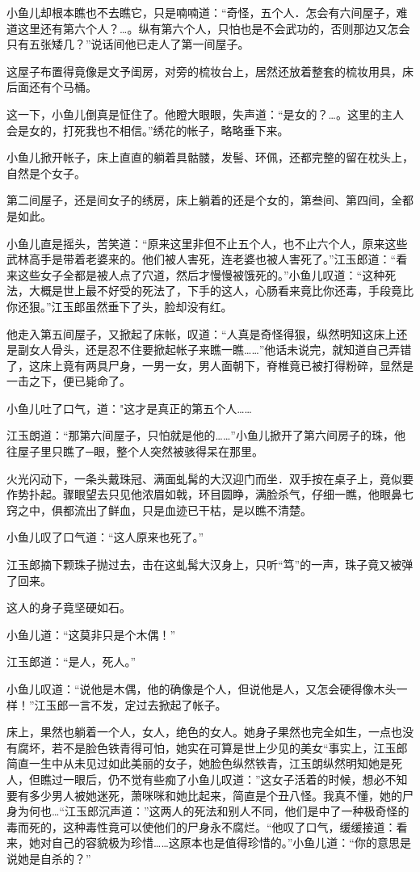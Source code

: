 \documentclass[12pt,oneside]{book}
\begin{document}
小鱼儿却根本瞧也不去瞧它，只是喃喃道：``奇怪，五个人．怎会有六间屋子，难道这里还有第六个人？\ldots。纵有第六个人，只怕也是不会武功的，否则那边又怎会只有五张矮几？''说话间他已走人了第一间屋子。

这屋子布置得竟像是文予闺房，对旁的梳妆台上，居然还放着整套的梳妆用具，床后面还有个马桶。

这一下，小鱼儿倒真是怔住了。他瞪大眼眼，失声道：``是女的？\ldots。这里的主人会是女的，打死我也不相信。''绣花的帐子，略略垂下来。

小鱼儿掀开帐子，床上直直的躺着具骷髅，发髻、环佩，还都完整的留在枕头上，自然是个女子。

第二间屋子，还是间女子的绣房，床上躺着的还是个女的，第叁间、第四间，全都是如此。

小鱼儿直是摇头，苦笑道：``原来这里非但不止五个人，也不止六个人，原来这些武林高手是带着老婆来的。他们被人害死，连老婆也被人害死了。''江玉郎道：``看来这些女子全都是被人点了穴道，然后才慢慢被饿死的。''小鱼儿叹道：``这种死法，大概是世上最不好受的死法了，下手的这人，心肠看来竟比你还毒，手段竟比你还狠。''江玉郎虽然垂下了头，脸却没有红。

他走入第五间屋子，又掀起了床帐，叹道：``人真是奇怪得狠，纵然明知这床上还是副女人骨头，还是忍不住要掀起帐子来瞧一瞧\ldots\ldots{}''他话未说完，就知道自己弄错了，这床上竟有两具尸身，一男一女，男人面朝下，脊椎竟已被打得粉碎，显然是一击之下，便已毙命了。

小鱼儿吐了口气，道："这才是真正的第五个人\ldots\ldots{}

江玉朗道：``那第六间屋子，只怕就是他的\ldots\ldots{}''小鱼儿掀开了第六间房子的珠，他往屋子里只瞧了─眼，整个人突然被骇得呆在那里。

火光闪动下，一条头戴珠冠、满面虬髯的大汉迎门而坐．双手按在桌子上，竟似要作势扑起。骤眼望去只见他浓眉如戟，环目圆睁，满脸杀气，仔细一瞧，他眼鼻七窍之中，俱都流出了鲜血，只是血迹已干枯，是以瞧不清楚。

小鱼儿叹了口气道：``这人原来也死了。''

江玉郎摘下颗珠子抛过去，击在这虬髯大汉身上，只听``笃''的一声，珠子竟又被弹了回来。

这人的身子竟坚硬如石。

小鱼儿道：``这莫非只是个木偶！''

江玉郎道：``是人，死人。''

小鱼儿叹道：``说他是木偶，他的确像是个人，但说他是人，又怎会硬得像木头一样！''江玉郎一言不发，定过去掀起了帐子。

床上，果然也躺着一个人，女人，绝色的女人。她身子果然也完全如生，一点也没有腐坏，若不是脸色铁青得可怕，她实在可算是世上少见的美女``事实上，江玉郎简直一生中从未见过如此美丽的女子，她脸色纵然铁青，江玉朗纵然明知她是死人，但瞧过一眼后，仍不觉有些痴了小鱼儿叹道：''这女子活着的时候，想必不知要有多少男人被她迷死，萧咪咪和她比起来，简直是个丑八怪。我真不懂，她的尸身为何也\ldots{}``江玉郎沉声道：''这两人的死法和别人不同，他们是中了一种极奇怪的毒而死的，这种毒性竟可以使他们的尸身永不腐烂。``他叹了口气，缓缓接道：看来，她对自己的容貌极为珍惜\ldots\ldots 这原本也是值得珍惜的。''小鱼儿道：``你的意思是说她是自杀的？''
\end{document}
